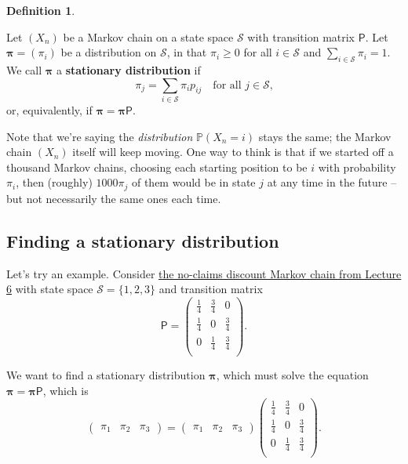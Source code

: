 \documentclass[
  a4paper,
]{article}
\theoremstyle{definition}
\newtheorem{definition}{Definition}[section]
\theoremstyle{definition}
\theoremstyle{definition}
\theoremstyle{remark}
\begin{document}
\begin{definition}
\protect\hypertarget{def:unlabeled-div-12}{}\label{def:unlabeled-div-12}

Let \((X_n)\) be a Markov chain on a state space \(\mathcal S\) with transition matrix \(\mathsf P\).
Let \(\boldsymbol \pi = (\pi_i)\) be a distribution on \(\mathcal S\), in that \(\pi_i \geq 0\) for all \(i \in \mathcal S\) and \(\sum_{i \in \mathcal S} \pi_i = 1\). We call \(\boldsymbol \pi\) a \textbf{stationary distribution} if
\[ \pi_j = \sum_{i\in \mathcal S} \pi_i p_{ij} \quad \text{for all $j \in \mathcal S$,} \]
or, equivalently, if \(\boldsymbol \pi = \boldsymbol \pi\mathsf P\).

\end{definition}

Note that we're saying the \emph{distribution} \(\mathbb P(X_n = i)\) stays the same; the Markov chain \((X_n)\) itself will keep moving. One way to think is that if we started off a thousand Markov chains, choosing each starting position to be \(i\) with probability \(\pi_i\), then (roughly) \(1000 \pi_j\) of them would be in state \(j\) at any time in the future -- but not necessarily the same ones each time.

\hypertarget{find-stationary}{%
\subsection{Finding a stationary distribution}\label{find-stationary}}

Let's try an example. Consider \protect\hyperlink{S06-example1}{the no-claims discount Markov chain from Lecture 6} with state space \(\mathcal S=\{1,2,3\}\) and transition matrix
\[ \mathsf P =\begin{pmatrix}
    \tfrac14 &\tfrac34 & 0\\
    \tfrac14 &0 & \tfrac34\\
    0 &\tfrac14 & \tfrac34\\
    \end{pmatrix} .\]

We want to find a stationary distribution \(\boldsymbol \pi\), which must solve the equation \(\boldsymbol \pi =\boldsymbol \pi\mathsf P\), which is
\[ \begin{pmatrix} \pi_1 & \pi_2 & \pi_3 \end{pmatrix}  = \begin{pmatrix} \pi_1 & \pi_2 & \pi_3 \end{pmatrix}  \begin{pmatrix}
    \tfrac14 &\tfrac34 & 0\\
    \tfrac14 &0 & \tfrac34\\
    0 &\tfrac14 & \tfrac34\\
    \end{pmatrix} .\]
\end{document}
